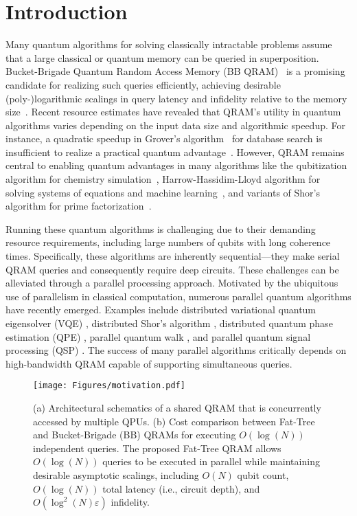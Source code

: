 \section{Introduction}

Many quantum algorithms for solving classically intractable problems assume that a large classical or quantum memory can be queried in superposition. Bucket-Brigade Quantum Random Access Memory (BB QRAM)~\cite{giovannetti2008quantum} is a promising candidate for realizing such queries efficiently, achieving desirable (poly-)logarithmic scalings in query latency and infidelity relative to the memory size~\cite{hann2021practicality}.  Recent resource estimates have revealed that QRAM's utility in quantum algorithms varies depending on the input data size and algorithmic speedup. For instance, a quadratic speedup in Grover's algorithm~\cite{grover1996fast} for database search is insufficient to realize a practical quantum advantage~\cite{jaques2023qram, hoefler2023disentangling}. However, QRAM remains central to enabling quantum advantages in many algorithms like the qubitization algorithm for chemistry simulation~\cite{lee2021even, berry2019qubitization, van2020convex}, Harrow-Hassidim-Lloyd algorithm for solving systems of equations and machine learning~\cite{biamonte2017quantum, harrow2009quantum}, and variants of Shor's algorithm for prime factorization~\cite{gidney2021factor, shor1994algorithms}. 

Running these quantum algorithms is challenging due to their demanding resource requirements, including large numbers of qubits with long coherence times. Specifically, these algorithms are inherently sequential---they make serial QRAM queries and consequently require deep circuits. These challenges can be alleviated through a parallel processing approach. Motivated by the ubiquitous use of parallelism in classical computation, numerous parallel quantum algorithms have recently emerged. Examples include distributed variational quantum eigensolver (VQE) \cite{niu2023parameter}, distributed Shor's algorithm \cite{meter2006architecture}, distributed quantum phase estimation (QPE) \cite{liu2021distributed, ang2022architectures}, parallel quantum walk \cite{zhang2024parallel}, and parallel quantum signal processing (QSP) \cite{martyn2024parallel}. The success of many parallel algorithms critically depends on high-bandwidth QRAM capable of supporting simultaneous queries. 


\begin{figure}
    \centering
    \texttt{[image: Figures/motivation.pdf]} %
    \caption{(a) Architectural schematics of a shared QRAM that is concurrently accessed by multiple QPUs. (b) Cost comparison between Fat-Tree and Bucket-Brigade (BB) QRAMs for executing $O(\log(N))$ independent queries. The proposed Fat-Tree QRAM allows $O(\log(N))$ queries to be executed in parallel while maintaining desirable asymptotic scalings, including $O(N)$ qubit count, $O(\log(N))$ total latency (i.e., circuit depth), and $O(\log^2(N) \varepsilon)$ infidelity.}
    \label{fig:motivation}
\end{figure}



